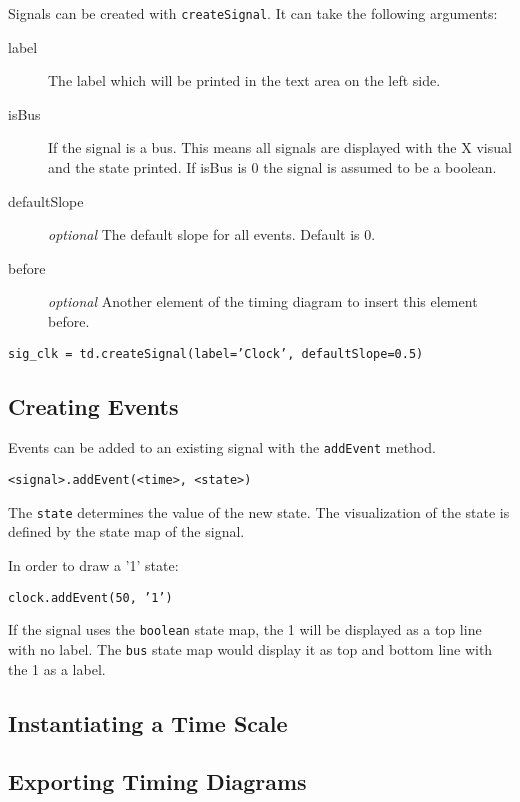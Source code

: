 \documentclass[11pt]{article}
\begin{document}
Signals can be created with \texttt{createSignal}. It can take the following
arguments:

\begin{description}
\item[label] The label which will be printed in the text area on the left side.
\item[isBus] If the signal is a bus. This means all signals are displayed with the X visual
and the state printed. If isBus is 0 the signal is assumed to be a boolean. 
\item[defaultSlope] \emph{optional} The default slope for all events. Default is 0.
\item[before] \emph{optional} Another element of the timing diagram to insert this element before.  
\end{description}

\begin{center}
  \texttt{sig\_clk = td.createSignal(label='Clock', defaultSlope=0.5)}
\end{center}

\subsection{Creating Events}
\label{sec:evt}

Events can be added to an existing signal with the \texttt{addEvent} method.

\texttt{<signal>.addEvent(<time>, <state>)}

The \texttt{state} determines the value of the new state. The visualization of
the state is defined by the state map of the signal. 

In order to draw a '1' state:

\texttt{clock.addEvent(50, '1')}

If the signal uses the \texttt{boolean} state map, the 1 will be displayed as a
top line with no label. The \texttt{bus} state map would display it as top and
bottom line with the 1 as a label.


\subsection{Instantiating a Time Scale}
\label{sec:tis}



\subsection{Exporting Timing Diagrams}
\label{sec:exp}
\end{document}
